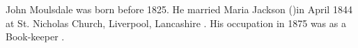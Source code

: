 
John Moulsdale was born before 1825.  He married Maria Jackson ()in April 1844 at St. Nicholas Church, Liverpool, Lancashire \cite{JohnMoulsdaleMarriage}.  His occupation in 1875 	was as a Book-keeper \cite{JohnMoulsdaleOccupation}.
